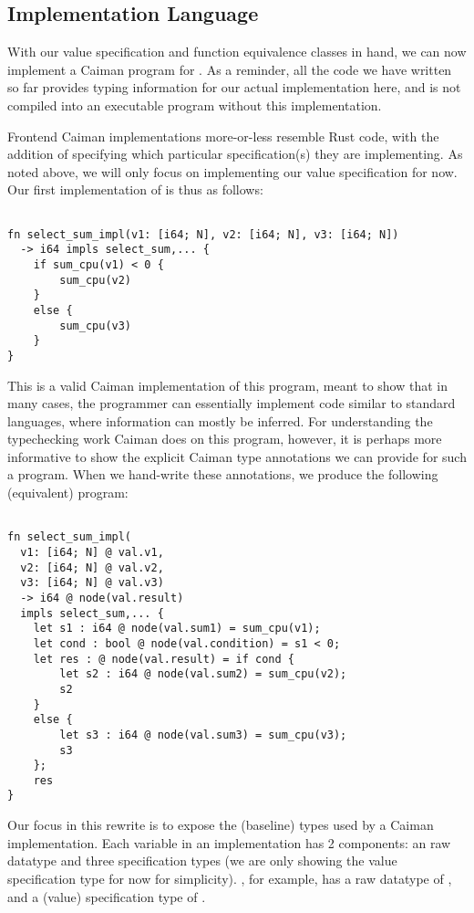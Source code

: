 \subsection{Implementation Language}
\label{subsec:implementation}

With our value specification and function equivalence classes in hand, we can now implement a Caiman program for .  As a reminder, all the code we have written so far provides typing information for our actual implementation here, and is not compiled into an executable program without this implementation.

Frontend Caiman implementations more-or-less resemble Rust code, with the addition of specifying which particular specification(s) they are implementing.  As noted above, we will only focus on implementing our value specification for now.  Our first implementation of  is thus as follows:
%
\begin{lstlisting}

fn select_sum_impl(v1: [i64; N], v2: [i64; N], v3: [i64; N]) 
  -> i64 impls select_sum,... {
    if sum_cpu(v1) < 0 { 
        sum_cpu(v2)
    }
    else {
        sum_cpu(v3)
    }
}
\end{lstlisting}
%
This is a valid Caiman implementation of this program, meant to show that in many cases, the programmer can essentially implement code similar to standard languages, where information can mostly be inferred.  For understanding the typechecking work Caiman does on this program, however, it is perhaps more informative to show the explicit Caiman type annotations we can provide for such a program.  When we hand-write these annotations, we produce the following (equivalent) program:
%
\begin{lstlisting}

fn select_sum_impl(
  v1: [i64; N] @ val.v1,
  v2: [i64; N] @ val.v2,
  v3: [i64; N] @ val.v3)
  -> i64 @ node(val.result)
  impls select_sum,... {
    let s1 : i64 @ node(val.sum1) = sum_cpu(v1);
    let cond : bool @ node(val.condition) = s1 < 0;
    let res : @ node(val.result) = if cond {
        let s2 : i64 @ node(val.sum2) = sum_cpu(v2);
        s2
    }
    else {
        let s3 : i64 @ node(val.sum3) = sum_cpu(v3);
        s3
    };
    res
}
\end{lstlisting}
%
Our focus in this rewrite is to expose the (baseline) types used by a Caiman implementation.  Each variable in an implementation has 2 components: an raw datatype and three specification types (we are only showing the value specification type for now for simplicity).  , for example, has a raw datatype of , and a (value) specification type of .

